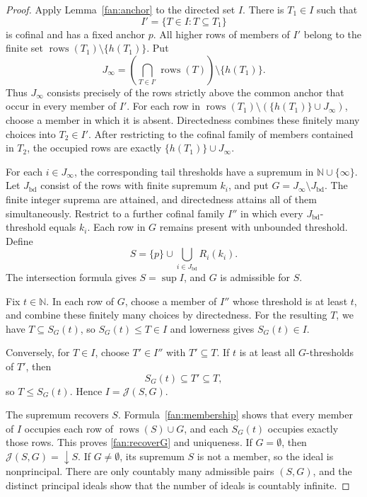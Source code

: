 \documentclass[10pt,a4paper]{article}
\theoremstyle{definition}
\newcommand{\N}{\mathbb N}
\newcommand{\rows}{\operatorname{rows}}
\begin{document}
\begin{proof}
Apply Lemma~\ref{fan:anchor} to the directed set $I$. There is $T_1\in I$ such that
\[
 I' =\{T\in I:T\subseteq T_1\}
\]
is cofinal and has a fixed anchor $p$. All higher rows of members of $I'$ belong to the finite set $\rows(T_1)\setminus\{h(T_1)\}$. Put
\[
 J_\infty=\left(\bigcap_{T\in I'}\rows(T)\right)\setminus\{h(T_1)\}.
\]
Thus $J_\infty$ consists precisely of the rows strictly above the common anchor that occur in every member of $I'$. For each row in $\rows(T_1)\setminus(\{h(T_1)\}\cup J_\infty)$, choose a member in which it is absent. Directedness combines these finitely many choices into $T_2\in I'$. After restricting to the cofinal family of members contained in $T_2$, the occupied rows are exactly $\{h(T_1)\}\cup J_\infty$.

For each $i\in J_\infty$, the corresponding tail thresholds have a supremum in $\N\cup\{\infty\}$. Let $J_{\mathrm{bd}}$ consist of the rows with finite supremum $k_i$, and put $G=J_\infty\setminus J_{\mathrm{bd}}$. The finite integer suprema are attained, and directedness attains all of them simultaneously. Restrict to a further cofinal family $I''$ in which every $J_{\mathrm{bd}}$-threshold equals $k_i$. Each row in $G$ remains present with unbounded threshold. Define
\[
 S=\{p\}\cup\bigcup_{i\in J_{\mathrm{bd}}}R_i(k_i).
\]
The intersection formula gives $S=\sup I$, and $G$ is admissible for $S$.

Fix $t\in\N$. In each row of $G$, choose a member of $I''$ whose threshold is at least $t$, and combine these finitely many choices by directedness. For the resulting $T$, we have $T\subseteq S_G(t)$, so $S_G(t)\leq T\in I$ and lowerness gives $S_G(t)\in I$.

Conversely, for $T\in I$, choose $T'\in I''$ with $T'\subseteq T$. If $t$ is at least all $G$-thresholds of $T'$, then
\[
 S_G(t)\subseteq T'\subseteq T,
\]
so $T\leq S_G(t)$. Hence $I=\mathcal J(S,G)$.

The supremum recovers $S$. Formula~\eqref{fan:membership} shows that every member of $I$ occupies each row of $\rows(S)\cup G$, and each $S_G(t)$ occupies exactly those rows. This proves \eqref{fan:recoverG} and uniqueness. If $G=\emptyset$, then $\mathcal J(S,G)={\downarrow} S$. If $G\neq\emptyset$, its supremum $S$ is not a member, so the ideal is nonprincipal. There are only countably many admissible pairs $(S,G)$, and the distinct principal ideals show that the number of ideals is countably infinite.
\end{proof}
\end{document}
